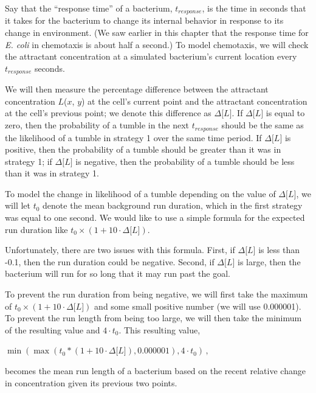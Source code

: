 Say that the ``response time'' of a bacterium, $t_{response}$, is the time in seconds that it takes for the bacterium to change its internal behavior in response to its change in environment. (We saw earlier in this chapter that the response time for \textit{E. coli} in chemotaxis is about half a second.) To model chemotaxis, we will check the attractant concentration at a simulated bacterium's current location every $t_{response}$ seconds.

We will then measure the percentage difference between the attractant concentration $L$($x$, $y$) at the cell's current point and the attractant concentration at the cell's previous point; we denote this difference as $\Delta\text{[}L{]}$. If $\Delta\text{[}L{]}$ is equal to zero, then the probability of a tumble in the next $t_{response}$ should be the same as the likelihood of a tumble in strategy 1 over the same time period. If $\Delta\text{[}L{]}$ is positive, then the probability of a tumble should be greater than it was in strategy 1; if $\Delta\text{[}L{]}$ is negative, then the probability of a tumble should be less than it was in strategy 1.

To model the change in likelihood of a tumble depending on the value of $\Delta\text{[}L{]}$, we will let $t_0$ denote the mean background run duration, which in the first strategy was equal to one second. We would like to use a simple formula for the expected run duration like $t_0 \times (1 + 10 · \Delta\text{[}L{]})$.

Unfortunately, there are two issues with this formula. First, if $\Delta\text{[}L{]}$ is less than -0.1, then the run duration could be negative. Second, if $\Delta\text{[}L{]}$ is large, then the bacterium will run for so long that it may run past the goal.

To prevent the run duration from being negative, we will first take the maximum of $t_0 \times (1 + 10 · \Delta\text{[}L{]})$ and some small positive number (we will use 0.000001). To prevent the run length from being too large, we will then take the minimum of the resulting value and $4 \cdot t_0$. This resulting value,

\begin{center}
$\min(\max(t_0 * (1 + 10 \cdot \Delta\text{[}L{]}), 0.000001), 4 \cdot t_0)\,,$
\end{center}

becomes the mean run length of a bacterium based on the recent relative change in concentration given its previous two points.\\


